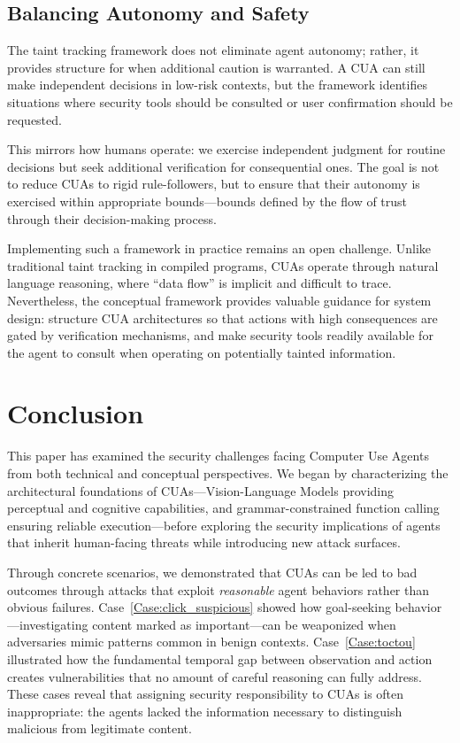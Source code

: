 \subsection{Balancing Autonomy and Safety}

The taint tracking framework does not eliminate agent autonomy; rather, it provides structure for when additional caution is warranted. A CUA can still make independent decisions in low-risk contexts, but the framework identifies situations where security tools should be consulted or user confirmation should be requested.

This mirrors how humans operate: we exercise independent judgment for routine decisions but seek additional verification for consequential ones. The goal is not to reduce CUAs to rigid rule-followers, but to ensure that their autonomy is exercised within appropriate bounds---bounds defined by the flow of trust through their decision-making process.

Implementing such a framework in practice remains an open challenge. Unlike traditional taint tracking in compiled programs, CUAs operate through natural language reasoning, where ``data flow'' is implicit and difficult to trace. Nevertheless, the conceptual framework provides valuable guidance for system design: structure CUA architectures so that actions with high consequences are gated by verification mechanisms, and make security tools readily available for the agent to consult when operating on potentially tainted information.

\section{Conclusion}

This paper has examined the security challenges facing Computer Use Agents from both technical and conceptual perspectives. We began by characterizing the architectural foundations of CUAs---Vision-Language Models providing perceptual and cognitive capabilities, and grammar-constrained function calling ensuring reliable execution---before exploring the security implications of agents that inherit human-facing threats while introducing new attack surfaces.

Through concrete scenarios, we demonstrated that CUAs can be led to bad outcomes through attacks that exploit \emph{reasonable} agent behaviors rather than obvious failures. Case~\ref{Case:click_suspicious} showed how goal-seeking behavior---investigating content marked as important---can be weaponized when adversaries mimic patterns common in benign contexts. Case~\ref{Case:toctou} illustrated how the fundamental temporal gap between observation and action creates vulnerabilities that no amount of careful reasoning can fully address. These cases reveal that assigning security responsibility to CUAs is often inappropriate: the agents lacked the information necessary to distinguish malicious from legitimate content.

